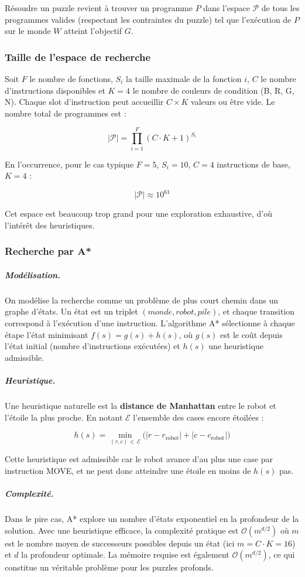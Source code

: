 Résoudre un puzzle revient à trouver un programme $P$ dans l'espace $\mathcal{P}$ de tous les programmes valides (respectant les contraintes du puzzle) tel que l'exécution de $P$ sur le monde $W$ atteint l'objectif $G$.

\subsubsection*{Taille de l'espace de recherche}

Soit $F$ le nombre de fonctions, $S_i$ la taille maximale de la fonction $i$, $C$ le nombre d'instructions disponibles et $K = 4$ le nombre de couleurs de condition (B, R, G, N). Chaque slot d'instruction peut accueillir $C \times K$ valeurs ou être vide. Le nombre total de programmes est :

\[
  |\mathcal{P}| = \prod_{i=1}^{F} (C \cdot K + 1)^{S_i}
\]

En l'occurrence, pour le cas typique $F = 5$, $S_i = 10$, $C = 4$ instructions de base, $K = 4$ :

\[
  |\mathcal{P}| \approx 10^{61}
\]

Cet espace est beaucoup trop grand pour une exploration exhaustive, d'où l'intérêt des heuristiques.

\subsubsection*{Recherche par A*}

\subparagraph{Modélisation.}
On modélise la recherche comme un problème de plus court chemin dans un graphe d'états. Un état est un triplet $(monde, robot, pile)$, et chaque transition correspond à l'exécution d'une instruction. L'algorithme A* sélectionne à chaque étape l'état minimisant $f(s) = g(s) + h(s)$, où $g(s)$ est le coût depuis l'état initial (nombre d'instructions exécutées) et $h(s)$ une heuristique admissible.

\subparagraph{Heuristique.}
Une heuristique naturelle est la \textbf{distance de Manhattan} entre le robot et l'étoile la plus proche. En notant $\mathcal{E}$ l'ensemble des cases encore étoilées :

\[
  h(s) = \min_{(r,c)\,\in\,\mathcal{E}} \bigl(|r - r_{\mathrm{robot}}| + |c - c_{\mathrm{robot}}|\bigr)
\]

Cette heuristique est admissible car le robot avance d'au plus une case par instruction MOVE, et ne peut donc atteindre une étoile en moins de $h(s)$ pas.

\subparagraph{Complexité.}
Dans le pire cas, A* explore un nombre d'états exponentiel en la profondeur de la solution. Avec une heuristique efficace, la complexité pratique est $\mathcal{O}(m^{d/2})$ où $m$ est le nombre moyen de successeurs possibles depuis un état (ici $m = C \cdot K = 16$) et $d$ la profondeur optimale. La mémoire requise est également $\mathcal{O}(m^{d/2})$, ce qui constitue un véritable problème pour les puzzles profonds.

